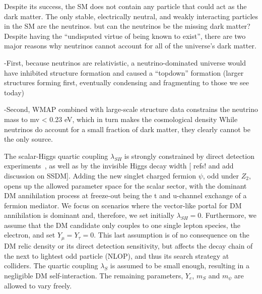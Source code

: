 \documentclass[12pt,letterpaper]{article}
\begin{document}
	\begin{tcolorbox}[title= Slide 3 Motivation]

	Despite its success, the SM does not contain any particle that could act as the dark matter. The only stable,
	electrically neutral, and weakly interacting particles in the SM are the neutrinos. 
	but can the neutrinos be the missing dark matter? Despite having the “undisputed virtue of being known to exist”,
	there are two major reasons why neutrinos cannot account for all of the universe’s dark matter. 
	
	-First, because neutrinos are relativistic, a neutrino-dominated universe would have inhibited structure formation and caused a “topdown” 
	formation (larger structures forming first, eventually condensing and fragmenting to those we see today)
	
	-Second, WMAP combined with large-scale structure data constrains the neutrino mass to mv < 0.23 eV, which
	in turn makes the cosmological density While neutrinos do account for a small fraction of dark 	matter, they clearly cannot be the only source.
	
	\end{tcolorbox}
	
	\begin{tcolorbox}[title= Slide  ]
The scalar-Higgs quartic coupling $ \lambda_{SH}$ is strongly constrained by direct detection experiments~\cite{Akerib:2016vxi},
as well as by the invisible Higgs decay width {[ refs! and add discussion on SSDM]}. %
Adding the new singlet charged fermion $\psi$, odd under $Z_2$, opens up the allowed parameter space for the scalar sector,
with the dominant DM annihilation process at freeze-out being the t and u-channel exchange of a fermion mediator.
We focus on scenarios where
the vector-like portal for DM annihilation is dominant and, therefore, we set initially $ \lambda_{SH}=0$.
Furthermore, we assume that the DM candidate only couples to one single lepton species, the electron, and set $Y_\mu=Y_\tau=0$.
This last assumption is of no consequence on the DM relic density or its direct detection sensitivity,
but affects the decay chain of the next to lightest odd particle (NLOP), and thus its search strategy at colliders.
The quartic coupling $\lambda_S$ is assumed to be small enough, resulting in  a negligible DM self-interaction.
The remaining parameters, $Y_e$,  $m_S$ and  $m_\psi$ are allowed to vary freely.

	\end{tcolorbox}
\end{document}
